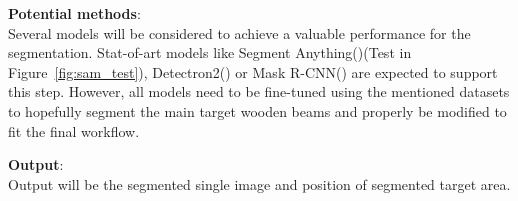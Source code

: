 \textbf{Potential methods}:\\
Several models will be considered to achieve a valuable performance for the segmentation. Stat-of-art models like Segment Anything(\cite{kirillov2023segany})(Test in Figure~\ref{fig:sam_test}), Detectron2(\cite{wu2019detectron2}) or Mask R-CNN(\cite{matterport_maskrcnn_2017}) are expected to support this step. However, all models need to be fine-tuned using the mentioned datasets to hopefully segment the main target wooden beams and properly be modified to fit the final workflow.

\hspace*{\fill}

\textbf{Output}:\\
Output will be the segmented single image and position of segmented target area.

\hspace*{\fill}


